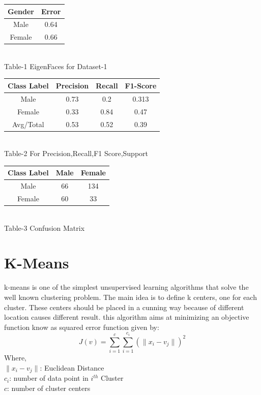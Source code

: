 \documentclass[journal]{IEEEtran}
\begin{document}
		
		\begin{center}
			\begin{tabular}{||c c ||} 
				\hline
				Gender & Error \\ 
				\hline\hline
				Male & 0.64  \\ 
				\hline
				Female & 0.66  \\
			\end{tabular}\\
			\small Table-1 EigenFaces for Dataset-1
			\vspace{0.5cm}\\
			\begin{tabular}{||c c c c||} 
				\hline
				Class Label & Precision & Recall & F1-Score \\ 
				\hline\hline
				Male & 0.73 & 0.2 & 0.313 \\ 
				\hline
				Female & 0.33 & 0.84 & 0.47 \\ 
				\hline
				Avg/Total & 0.53 & 0.52 & 0.39 \\ 
				
			\end{tabular}\\
			\small Table-2 For Precision,Recall,F1 Score,Support
			\vspace{0.5cm}
			
			\begin{tabular}{||c c c ||} 
				\hline
				Class Label & Male & Female \\ 
				\hline\hline
				Male & 66 & 134  \\ 
				\hline
				Female & 60 & 33  \\
			\end{tabular}\\
			\small Table-3 Confusion Matrix
			
		\end{center}
		
	
	\section{K-Means}
	k-means is  one of  the simplest unsupervised  learning  algorithms  that  solve  the
	well  known clustering problem.  The  main  idea  is to define k centers, one for
	each cluster. These centers  should  be placed in a cunning  way  because
	of  different  location  causes different  result. this  algorithm  aims at  minimizing  an
	objective function know as squared error function given by:
	$$ J(v)= \sum_{i=1}^{c} \sum_{i=1}^{c_i} (\parallel x_i - v_j \parallel)^2$$
	Where,\\
	$\parallel x_i - v_j \parallel$: Euclidean Distance\\
	$c_i$: number of data point in $i^{th}$ Cluster\\
	$c$: number of cluster centers
	
\end{document}
